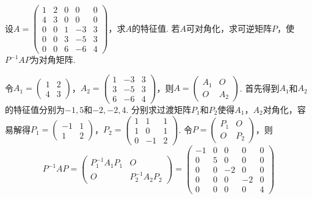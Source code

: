 \begin{exercise}
\begin{exgroup}
        \item 设$A=\begin{pmatrix}
                1 & 2 & 0 & 0  & 0 \\ 4 & 3 & 0 & 0 & 0 \\ 0 & 0 & 1 & -3 & 3 \\ 0 & 0 & 3 & -5 & 3 \\
                0 & 0 & 6 & -6 & 4
            \end{pmatrix}$，求$A$的特征值. 若$A$可对角化，求可逆矩阵$P$，使$P^{-1}AP$为对角矩阵.
        \begin{answer}
            令$A_1=\begin{pmatrix}
                1 & 2 \\ 4 & 3
            \end{pmatrix}$，$A_2=\begin{pmatrix}
                1 & -3 & 3 \\ 3 & -5 & 3 \\ 6 & -6 & 4
            \end{pmatrix}$，则$A=\begin{pmatrix}
                A_1 & O \\ O & A_2
            \end{pmatrix}$. 首先得到$A_1$和$A_2$的特征值分别为$-1,5$和$-2,-2,4$. 分别求过渡矩阵$P_1$和$P_2$使得$A_1$，$A_2$对角化，容易解得$P_1=\begin{pmatrix}
                -1 & 1 \\ 1 & 2
            \end{pmatrix}$，$P_2=\begin{pmatrix}
                1 & 1 & 1 \\ 1 & 0 & 1 \\ 0 & -1 & 2
            \end{pmatrix}$. 令$P=\begin{pmatrix}
                P_1 & O \\ O & P_2
            \end{pmatrix}$，则
        \[P^{-1}AP=\begin{pmatrix}
                P_1^{-1}A_1P_1 & O \\ O & P_2^{-1}A_2P_2
            \end{pmatrix}=\begin{pmatrix}
                -1 & 0 & 0 & 0 & 0 \\ 0 & 5 & 0 & 0 & 0 \\ 0 & 0 & -2 & 0 & 0 \\ 0 & 0 & 0 & -2 & 0 \\ 0 & 0 & 0 & 0 & 4

\end{pmatrix}\]
\end{answer}
\end{exgroup}
\end{exercise}
